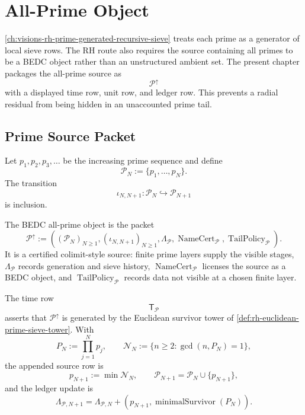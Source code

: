 \chapter{All-Prime Object}
\label{ch:visions-rh-all-prime-object}

\autoref{ch:visions-rh-prime-generated-recursive-sieve} treats each
prime as a generator of local sieve rows.  The RH route also requires
the source containing all primes to be a BEDC object rather than an
unstructured ambient set.  The present chapter packages the
all-prime source as
$$
\mathcal P^\uparrow
$$
with a displayed time row, unit row, and ledger row.  This prevents a
radial residual from being hidden in an unaccounted prime tail.

\section{Prime Source Packet}
\label{sec:rh-all-prime-object-source-packet}

\begin{definition}
\label{def:rh-finite-prime-source-layer}
Let $p_1,p_2,p_3,\ldots$ be the increasing prime sequence and define
$$
\mathcal P_N:=\{p_1,\ldots,p_N\}.
$$
The transition
$$
\iota_{N,N+1}:\mathcal P_N\hookrightarrow\mathcal P_{N+1}
$$
is inclusion.
\end{definition}

\begin{definition}[AllPrimeObject]
\label{def:rh-all-prime-object}
The BEDC all-prime object is the packet
$$
\mathcal P^\uparrow
:=
\left(
(\mathcal P_N)_{N\ge1},
(\iota_{N,N+1})_{N\ge1},
\Lambda_{\mathcal P},
\operatorname{NameCert}_{\mathcal P},
\operatorname{TailPolicy}_{\mathcal P}
\right).
$$
It is a certified colimit-style source: finite prime layers supply the
visible stages, $\Lambda_{\mathcal P}$ records generation and sieve
history, $\operatorname{NameCert}_{\mathcal P}$ licenses the source as
a BEDC object, and $\operatorname{TailPolicy}_{\mathcal P}$ records
data not visible at a chosen finite layer.
\end{definition}

\begin{definition}
\label{def:rh-prime-object-time-row}
The time row
$$
\mathsf T_{\mathcal P}
$$
asserts that $\mathcal P^\uparrow$ is generated by the Euclidean
survivor tower of \autoref{def:rh-euclidean-prime-sieve-tower}.  With
$$
P_N:=\prod_{j=1}^{N}p_j,
\qquad
\mathcal N_N:=\{n\ge2:\gcd(n,P_N)=1\},
$$
the appended source row is
$$
p_{N+1}:=\min\mathcal N_N,
\qquad
\mathcal P_{N+1}=\mathcal P_N\cup\{p_{N+1}\},
$$
and the ledger update is
$$
\Lambda_{\mathcal P,N+1}
=
\Lambda_{\mathcal P,N}
+
(p_{N+1},\operatorname{minimalSurvivor}(P_N)).
$$
\end{definition}

